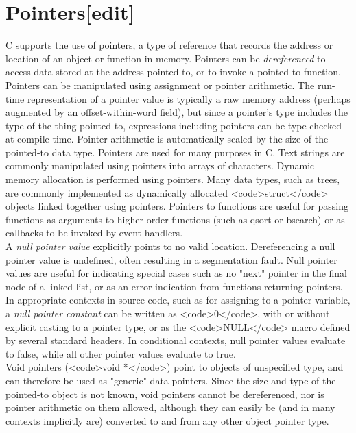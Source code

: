 \documentclass{article}\usepackage{titlesec}
\begin{document}
\section{Pointers[edit]}
C supports the use of pointers, a type of reference that records the address or location of an object or function in memory.  Pointers can be \emph{dereferenced} to access data stored at the address pointed to, or to invoke a pointed-to function.  Pointers can be manipulated using assignment or pointer arithmetic.  The run-time representation of a pointer value is typically a raw memory address (perhaps augmented by an offset-within-word field), but since a pointer's type includes the type of the thing pointed to, expressions including pointers can be type-checked at compile time.  Pointer arithmetic is automatically scaled by the size of the pointed-to data type. Pointers are used for many purposes in C.  Text strings are commonly manipulated using pointers into arrays of characters.  Dynamic memory allocation is performed using pointers.  Many data types, such as trees, are commonly implemented as dynamically allocated <code>struct</code> objects linked together using pointers.  Pointers to functions are useful for passing functions as arguments to higher-order functions (such as qsort or bsearch) or as callbacks to be invoked by event handlers.
\\
A \emph{null pointer value} explicitly points to no valid location. Dereferencing a null pointer value is undefined, often resulting in a segmentation fault.  Null pointer values are useful for indicating special cases such as no "next" pointer in the final node of a linked list, or as an error indication from functions returning pointers.  In appropriate contexts in source code, such as for assigning to a pointer variable, a \emph{null pointer constant} can be written as <code>0</code>, with or without explicit casting to a pointer type, or as the <code>NULL</code> macro defined by several standard headers.  In conditional contexts, null pointer values evaluate to false, while all other pointer values evaluate to true.
\\
Void pointers (<code>void *</code>) point to objects of unspecified type, and can therefore be used as "generic" data pointers. Since the size and type of the pointed-to object is not known, void pointers cannot be dereferenced, nor is pointer arithmetic on them allowed, although they can easily be (and in many contexts implicitly are) converted to and from any other object pointer type.
\\
\end{document}
